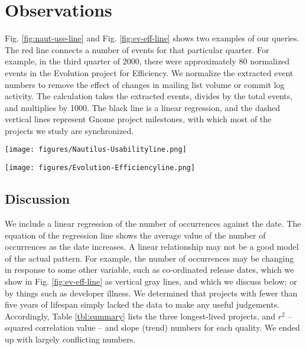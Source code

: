 \documentclass[conference, compsoc]{IEEEtran}
\begin{document}

\section{Observations}
\label{sec:observations}
Fig. \ref{fig:naut-use-line} and Fig. \ref{fig:ev-eff-line} shows two examples of our queries. The red line connects a number of events for that particular quarter. For example, in the third quarter of 2000, there were approximately 80 normalized events in the Evolution project for Efficiency. We normalize the extracted event numbers to remove the effect of changes in mailing list volume or commit log activity. The calculation takes the extracted events, divides by the total events, and multiplies by 1000. The black line is a linear regression, and the dashed vertical lines represent Gnome project milestones, with which most of the projects we study are synchronized.

\begin{figure*}[ht]
\begin{minipage}[b]{0.5\textwidth}
\centering
\texttt{[image: figures/Nautilus-Usabilityline.png]} %
\label{fig:naut-use-line}
\caption{Product: Nautilus, Quality: Usability}
\end{minipage}

\hspace{0.2cm}
\begin{minipage}[b]{0.5\textwidth}
\centering
\texttt{[image: figures/Evolution-Efficiencyline.png]}
\label{fig:ev-eff-line}
\caption{Product: Evolution, Quality: Efficiency}
\end{minipage}
\end{figure*}

\vspace{-2mm}
\subsection{Discussion}
\vspace{-2mm}

We include a linear regression of the number of occurrences against the date. The equation of the regression line shows the average value of the number of occurrences as the date increases. A linear relationship may not be a good model of the actual pattern. For example, the number of occurrences may be changing in response to some other variable, such as co-ordinated release dates, which we show in Fig. \ref{fig:ev-eff-line} as vertical gray lines, and which we discuss below; or by things such as developer illness. We determined that projects with fewer than five years of lifespan simply lacked the data to make any useful judgements. Accordingly, Table \ref{tbl:summary} lists the three longest-lived projects, and $r^2$  -- squared correlation value -- and slope (trend) numbers for each quality. We ended up with largely conflicting numbers. 
\end{document}
